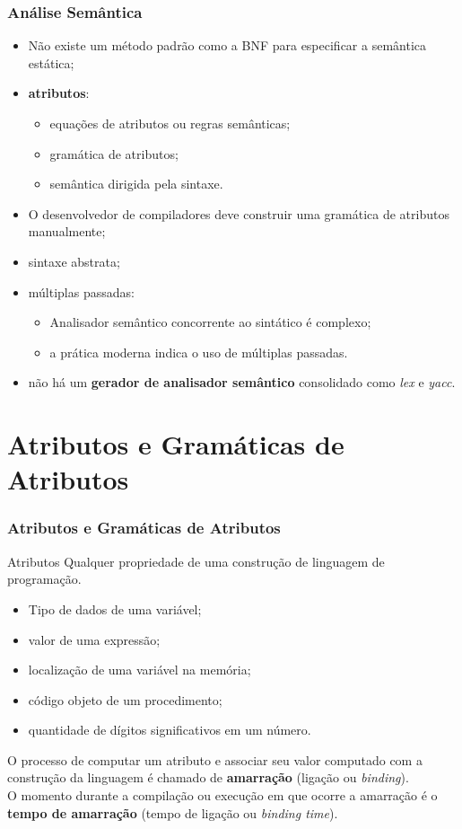 \documentclass[table]{beamer}
\begin{document}
\begin{frame}
   \frametitle{Análise Semântica}
   \begin{itemize}
      \item Não existe um método padrão como a BNF para especificar a semântica estática;
      \item \textbf{atributos}:
      \begin{itemize}
         \item equações de atributos ou regras semânticas;
	 \item gramática de atributos;
	 \item semântica dirigida pela sintaxe.
      \end{itemize}
      \item O desenvolvedor de compiladores deve construir uma gramática de atributos manualmente;
      \item sintaxe abstrata;
      \item múltiplas passadas:
      \begin{itemize}
         \item Analisador semântico concorrente ao sintático é complexo;
	 \item a prática moderna indica o uso de múltiplas passadas.
      \end{itemize}
      \item não há um \textbf{gerador de analisador semântico} consolidado como \textit{lex} e \textit{yacc}.
   \end{itemize}
\end{frame}

\section{Atributos e Gramáticas de Atributos}
\begin{frame}
   \frametitle{Atributos e Gramáticas de Atributos}
   \begin{block}{Atributos}
   Qualquer propriedade de uma construção de linguagem de programação.
   \begin{itemize}
      \item Tipo de dados de uma variável;
      \item valor de uma expressão;
      \item localização de uma variável na memória;
      \item código objeto de um procedimento;
      \item quantidade de dígitos significativos em um número.
   \end{itemize}
   \end{block}
   O processo de computar um atributo e associar seu valor computado com a construção da linguagem é chamado de \textbf{amarração} (ligação ou \textit{binding}). \\
   O momento durante a compilação ou execução em que ocorre a amarração é o \textbf{tempo de amarração} (tempo de ligação ou \textit{binding time}).
\end{frame}
\end{document}
